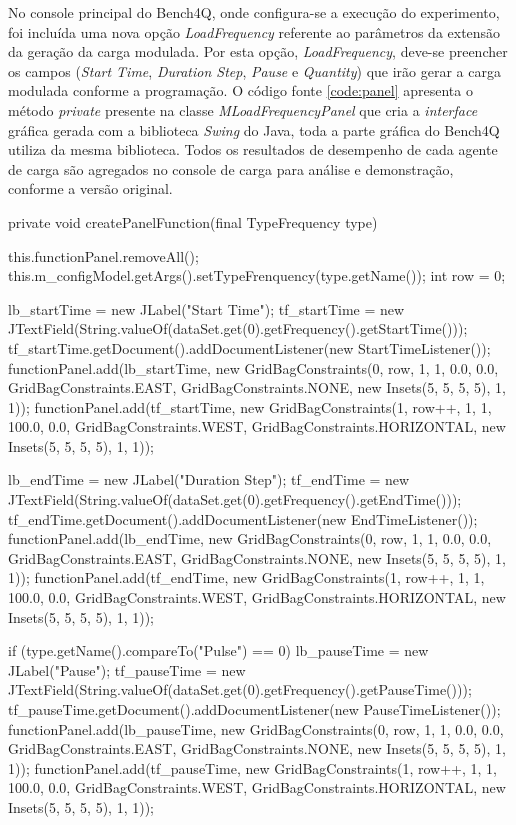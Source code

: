 No console principal do Bench4Q, onde configura-se a execução do experimento, foi incluída uma nova opção \textit{LoadFrequency} referente ao parâmetros da extensão da geração da carga modulada. Por esta opção, \textit{LoadFrequency}, deve-se preencher os campos (\textit{Start Time}, \textit{Duration Step}, \textit{Pause} e \textit{Quantity}) que irão gerar a carga modulada conforme a programação. O código fonte \ref{code:panel} apresenta o método \textit{private} presente na classe \textit{MLoadFrequencyPanel} que cria a \textit{interface} gráfica gerada com a biblioteca \textit{Swing} do Java, toda a parte gráfica do Bench4Q utiliza da mesma biblioteca. Todos os resultados de desempenho de cada agente de carga são agregados no console de carga para análise e demonstração, conforme a versão original.

\begin{codigo}[caption={Código para gerar a os parâmetros para a modulação}, label={code:panel}, breaklines=true]
	private void createPanelFunction(final TypeFrequency type) {
		
		this.functionPanel.removeAll();
		this.m_configModel.getArgs().setTypeFrenquency(type.getName());
		int row = 0;
		
		lb_startTime = new JLabel("Start Time");
		tf_startTime = new JTextField(String.valueOf(dataSet.get(0).getFrequency().getStartTime()));
		tf_startTime.getDocument().addDocumentListener(new StartTimeListener());
		functionPanel.add(lb_startTime, new GridBagConstraints(0, row, 1, 1, 0.0, 0.0, GridBagConstraints.EAST,
		GridBagConstraints.NONE, new Insets(5, 5, 5, 5), 1, 1));
		functionPanel.add(tf_startTime, new GridBagConstraints(1, row++, 1, 1, 100.0, 0.0, GridBagConstraints.WEST,
		GridBagConstraints.HORIZONTAL, new Insets(5, 5, 5, 5), 1, 1));
		
		lb_endTime = new JLabel("Duration Step");
		tf_endTime = new JTextField(String.valueOf(dataSet.get(0).getFrequency().getEndTime()));
		tf_endTime.getDocument().addDocumentListener(new EndTimeListener());
		functionPanel.add(lb_endTime, new GridBagConstraints(0, row, 1, 1, 0.0, 0.0, GridBagConstraints.EAST,
		GridBagConstraints.NONE, new Insets(5, 5, 5, 5), 1, 1));
		functionPanel.add(tf_endTime, new GridBagConstraints(1, row++, 1, 1, 100.0, 0.0, GridBagConstraints.WEST,
		GridBagConstraints.HORIZONTAL, new Insets(5, 5, 5, 5), 1, 1));
		
		if (type.getName().compareTo("Pulse") == 0) {
			lb_pauseTime = new JLabel("Pause");
			tf_pauseTime = new JTextField(String.valueOf(dataSet.get(0).getFrequency().getPauseTime()));
			tf_pauseTime.getDocument().addDocumentListener(new PauseTimeListener());
			functionPanel.add(lb_pauseTime, new GridBagConstraints(0, row, 1, 1, 0.0, 0.0, GridBagConstraints.EAST,
			GridBagConstraints.NONE, new Insets(5, 5, 5, 5), 1, 1));
			functionPanel.add(tf_pauseTime, new GridBagConstraints(1, row++, 1, 1, 100.0, 0.0, GridBagConstraints.WEST,
			GridBagConstraints.HORIZONTAL, new Insets(5, 5, 5, 5), 1, 1));
		}
		
}
\end{codigo}
